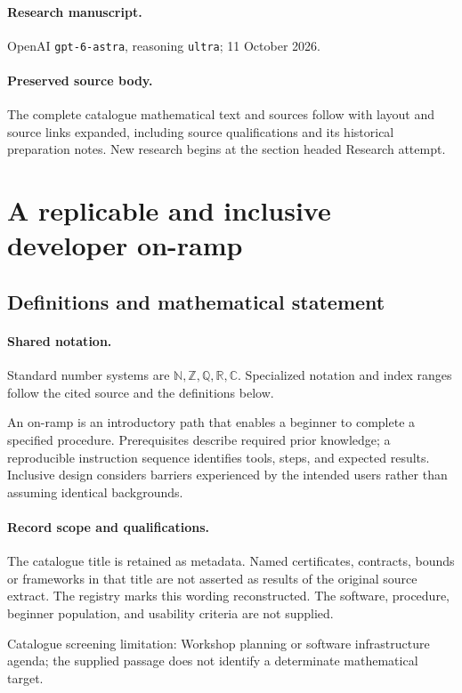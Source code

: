 \documentclass[11pt]{article}
\begin{document}
\paragraph{Research manuscript.} OpenAI \texttt{gpt-6-astra}, reasoning \texttt{ultra}; 11 October 2026.
\paragraph{Preserved source body.} The complete catalogue mathematical text and sources follow with layout and source links expanded, including source qualifications and its historical preparation notes. New research begins at the section headed Research attempt.

\section{A replicable and inclusive developer on-ramp}\label{statement}

\subsection{Definitions and mathematical statement}

\paragraph{Shared notation.}Standard number systems are $\mathbb N,\mathbb Z,\mathbb Q,\mathbb R,\mathbb C$. Specialized notation and index ranges follow the cited source and the definitions below.


An on-ramp is an introductory path that enables a beginner to complete a specified procedure. Prerequisites describe required prior knowledge; a reproducible instruction sequence identifies tools, steps, and expected results. Inclusive design considers barriers experienced by the intended users rather than assuming identical backgrounds.
\paragraph{Record scope and qualifications.}
The catalogue title is retained as metadata. Named certificates, contracts, bounds or frameworks in that title are not asserted as results of the original source extract.
The registry marks this wording reconstructed. The software, procedure, beginner population, and usability criteria are not supplied.

Catalogue screening limitation: Workshop planning or software infrastructure agenda; the supplied passage does not identify a determinate mathematical target.
\end{document}
